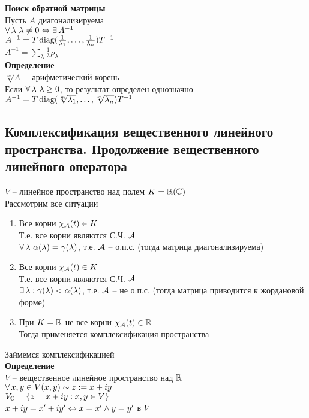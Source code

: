 \documentclass[12pt]{article}
\begin{document}
\textbf{Поиск обратной матрицы}\\
Пусть $A$ диагонализируема\\
$\forall\, \lambda\ \lambda \neq 0 \Leftrightarrow \exists\, A^{-1}$\\
$A^{-1} = T\operatorname{diag}(\frac1{\lambda_1}, \ldots, \frac1{\lambda_n})T^{-1}$\\
$A^{-1} = \sum_\lambda \frac1\lambda \rho_\lambda$\\
\textbf{Определение}\\
$\sqrt[m]A$ -- арифметический корень\\
Если $\forall\, \lambda\ \lambda \geq 0$, то результат определен однозначно\\
$A^{-1} = T\operatorname{diag}(\sqrt[m]{\lambda_1}, \ldots, \sqrt[m]{\lambda_n})T^{-1}$\\
\subsection{Комплексификация вещественного линейного пространства. Продолжение вещественного линейного оператора}
$V$ -- линейное пространство над полем $K = \mathbb{R} (\mathbb{C})$\\
Рассмотрим все ситуации
\begin{enumerate}
    \item Все корни $\chi_\mathcal{A}(t) \in K$\\
    Т.е. все корни являются С.Ч. $\mathcal{A}$\\
    $\forall\, \lambda\ \alpha(\lambda) = \gamma(\lambda)$, т.е. $\mathcal{A}$ -- о.п.с. (тогда матрица диагонализируема)
    \item Все корни $\chi_\mathcal{A}(t) \in K$\\
    Т.е. все корни являются С.Ч. $\mathcal{A}$\\
    $\exists\, \lambda: \gamma(\lambda) < \alpha(\lambda)$, т.е. $\mathcal{A}$ -- не о.п.с. (тогда матрица приводится к жордановой форме)
    \item При $K = \mathbb{R}$ не все корни $\chi_\mathcal{A}(t) \in \mathbb{R}$\\
    Тогда применяется комплексификация пространства
\end{enumerate}
Займемся комплексификацией\\
\textbf{Определение}\\
$V$ -- вещественное линейное пространство над $\mathbb{R}$\\
$\forall\, x,y \in V (x,y) \sim z:= x+iy$\\
$V_\mathbb{C} = \{ z = x+iy: x,y \in V \}$\\
$x+iy = x'+iy' \Leftrightarrow x=x' \land y=y'$ в $V$\\
\end{document}
